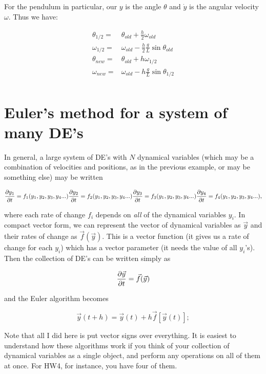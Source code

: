 \documentclass[12ampt]{article}
\def\PAR#1#2{ {{\partial #1}\over{\partial #2}} }
\begin{document}
For the pendulum in particular, our $y$ is the angle $\theta$ and $\dot y$ is the angular velocity $\omega$. Thus we have:

\begin{align}
  \theta_{1/2} =& \theta_{old} + \frac{h}{2} \omega_{old} \\
  \omega_{1/2} =& \omega_{old} - \frac{h}{2} \frac{g}{L} \sin \theta_{old} \\
  \theta_{new} =& \theta_{old} + h \omega_{1/2} \\
  \omega_{new} =& \omega_{old} - h \frac{g}{L} \sin \theta_{1/2} \\
\end{align}

  
\section{Euler's method for a system of many DE's}

In general, a large system of DE's with $N$ dynamical variables (which may be a combination of velocities and positions, as in the previous example, or may be something else) may be written

\begin{equation}
  \PAR{y_1}{t} = f_1(y_1,y_2,y_3,y_4...)\\
  \PAR{y_2}{t} = f_2(y_1,y_2,y_3,y_4...)\\
  \PAR{y_3}{t} = f_3(y_1,y_2,y_3,y_4...)\\
  \PAR{y_4}{t} = f_4(y_1,y_2,y_3,y_4...),
\end{equation}

where each rate of change $f_i$ depends on {\it all} of the dynamical variables $y_i$. In compact vector form, we can represent the vector of dynamical variables as $\vec y$ and their rates of change as $\vec f(\vec y)$. 
This is a vector function (it gives us a rate of change for each $y_i$) which has a vector parameter (it needs the value of all $y_i$'s). Then the collection of DE's can be written simply as 

\begin{equation}
  \PAR{\vec y}{t} = \vec f(\vec y)
\end{equation}

and the Euler algorithm becomes

\begin{equation}
  \vec y(t+h) = \vec y(t) + h \vec f\left[\vec y\left(t\right)\right];
\end{equation}

Note that all I did here is put vector signs over everything. It is easiest to understand how these algorithms work if you think of your collection of dynamical variables as a single object, and 
perform any operations on all of them at once. For HW4, for instance, you have four of them.
\end{document}

